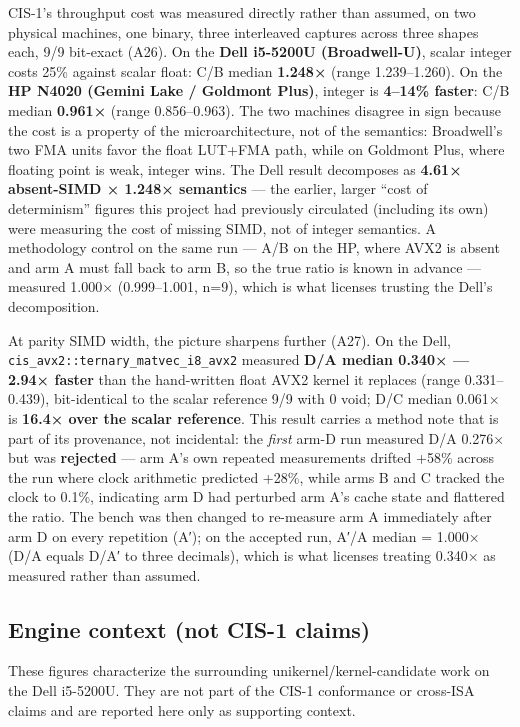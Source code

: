 \documentclass[11pt]{article}
\begin{document}
CIS-1's throughput cost was measured directly rather than assumed, on two
physical machines, one binary, three interleaved captures across three
shapes each, 9/9 bit-exact (A26). On the \textbf{Dell i5-5200U (Broadwell-U)},
scalar integer costs 25\% against scalar float: C/B median \textbf{1.248×}
(range 1.239--1.260). On the \textbf{HP N4020 (Gemini Lake / Goldmont Plus)},
integer is \textbf{4--14\% faster}: C/B median \textbf{0.961×} (range 0.856--0.963).
The two machines disagree in sign because the cost is a property of the
microarchitecture, not of the semantics: Broadwell's two FMA units favor the
float LUT+FMA path, while on Goldmont Plus, where floating point is weak,
integer wins. The Dell result decomposes as \textbf{4.61× absent-SIMD × 1.248×
semantics} --- the earlier, larger ``cost of determinism'' figures this project
had previously circulated (including its own) were measuring the cost of
missing SIMD, not of integer semantics. A methodology control on the same
run --- A/B on the HP, where AVX2 is absent and arm A must fall back to arm B,
so the true ratio is known in advance --- measured 1.000× (0.999--1.001, n=9),
which is what licenses trusting the Dell's decomposition.

At parity SIMD width, the picture sharpens further (A27). On the Dell,
\texttt{cis\_avx2::ternary\_matvec\_i8\_avx2} measured \textbf{D/A median 0.340× --- 2.94×
faster} than the hand-written float AVX2 kernel it replaces (range
0.331--0.439), bit-identical to the scalar reference 9/9 with 0 void; D/C
median 0.061× is \textbf{16.4× over the scalar reference}. This result carries a
method note that is part of its provenance, not incidental: the \emph{first}
arm-D run measured D/A 0.276× but was \textbf{rejected} --- arm A's own repeated
measurements drifted +58\% across the run where clock arithmetic predicted
+28\%, while arms B and C tracked the clock to 0.1\%, indicating arm D had
perturbed arm A's cache state and flattered the ratio. The bench was then
changed to re-measure arm A immediately after arm D on every repetition
(A′); on the accepted run, A′/A median = 1.000× (D/A equals D/A′ to three
decimals), which is what licenses treating 0.340× as measured rather than
assumed.

\subsection{Engine context (not CIS-1 claims)}\label{engine-context-not-cis-1-claims}

These figures characterize the surrounding unikernel/kernel-candidate work
on the Dell i5-5200U. They are not part of the CIS-1 conformance or
cross-ISA claims and are reported here only as supporting context.
\end{document}
